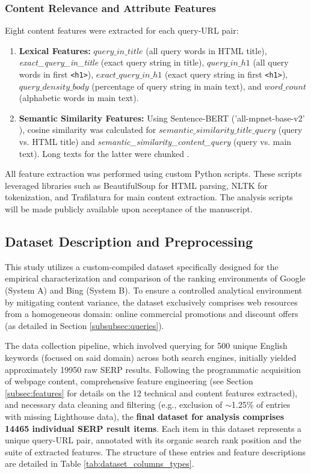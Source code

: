 \documentclass[a4paper,fleqn]{cas-sc}
\newcommand{\longvar}[1]{\textit{#1}}
\begin{document}
\subsubsection{Content Relevance and Attribute Features}
\label{subsubsec:content_features}
Eight content features were extracted for each query-URL pair:
\begin{enumerate}
\item \textbf{Lexical Features:} $query\_in\_title$ (all query words in HTML title), \longvar{exact_query_in_title} (exact query string in title), $query\_in\_h1$ (all query words in first \texttt{<h1>}), $exact\_query\_in\_h1$ (exact query string in first \texttt{<h1>}), $query\_density\_body$ (percentage of query string in main text), and $word\_count$ (alphabetic words in main text).
\item \textbf{Semantic Similarity Features:} Using Sentence-BERT ('all-mpnet-base-v2' \citep{Reimers2019, Song2020}), cosine similarity was calculated for $semantic\_similarity\_title\_query$ (query vs. HTML title) and \longvar{semantic_similarity_content_query} (query vs. main text). Long texts for the latter were chunked \citep{Beltagy2020, Devlin2019}.
\end{enumerate}
All feature extraction was performed using custom Python scripts. These scripts leveraged libraries such as BeautifulSoup for HTML parsing, NLTK for tokenization, and Trafilatura for main content extraction. The analysis scripts will be made publicly available upon acceptance of the manuscript.

\subsection{Dataset Description and Preprocessing}
\label{subsec:assembly}
This study utilizes a custom-compiled dataset specifically designed for the empirical characterization and comparison of the ranking environments of Google (System A) and Bing (System B). To ensure a controlled analytical environment by mitigating content variance, the dataset exclusively comprises web resources from a homogeneous domain: online commercial promotions and discount offers (as detailed in Section \ref{subsubsec:queries}).

The data collection pipeline, which involved querying for 500 unique English keywords (focused on said domain) across both search engines, initially yielded approximately \num{19950} raw SERP results. Following the programmatic acquisition of webpage content, comprehensive feature engineering (see Section \ref{subsec:features} for details on the 12 technical and content features extracted), and necessary data cleaning and filtering (e.g., exclusion of $\sim$1.25\% of entries with missing Lighthouse data), the \textbf{final dataset for analysis comprises \num{14465} individual SERP result items}. Each item in this dataset represents a unique query-URL pair, annotated with its organic search rank position and the suite of extracted features. The structure of these entries and feature descriptions are detailed in Table \ref{tab:dataset_columns_types}.
\end{document}

